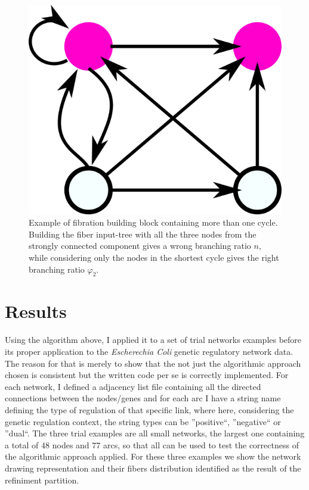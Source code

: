 \documentclass[12pt]{diazessay} %
\begin{document}
\begin{figure}[H]
	\centering
	\includegraphics[scale=0.32]{Figures/input.png}
	\caption{Example of fibration building block containing more than one cycle. Building the fiber input-tree with all the three nodes from the strongly connected component gives a wrong branching ratio $n$, while considering only the nodes in the shortest cycle gives the right branching ratio $\varphi_2$.}
	\label{fig:branch}
\end{figure}


\section*{Results}

Using the algorithm above, I applied it to a set of trial networks examples before its proper application to the \textit{Escherechia Coli} genetic regulatory network data. The reason for that is merely to show that the not just the algorithmic approach chosen is consistent but the written code per se is correctly implemented. For each network, I defined a adjacency list file containing all the directed connections between the nodes/genes and for each arc I have a string name defining the type of regulation of that specific link, where here, considering the genetic regulation context, the string types can be ''positive``, ''negative`` or ''dual``. The three trial examples are all small networks, the largest one containing a total of $48$ nodes and $77$ arcs, so that all can be used to test the correctness of the algorithmic approach applied. For these three examples we show the network drawing representation and their fibers distribution identified as the result of the refiniment partition.
\end{document}
